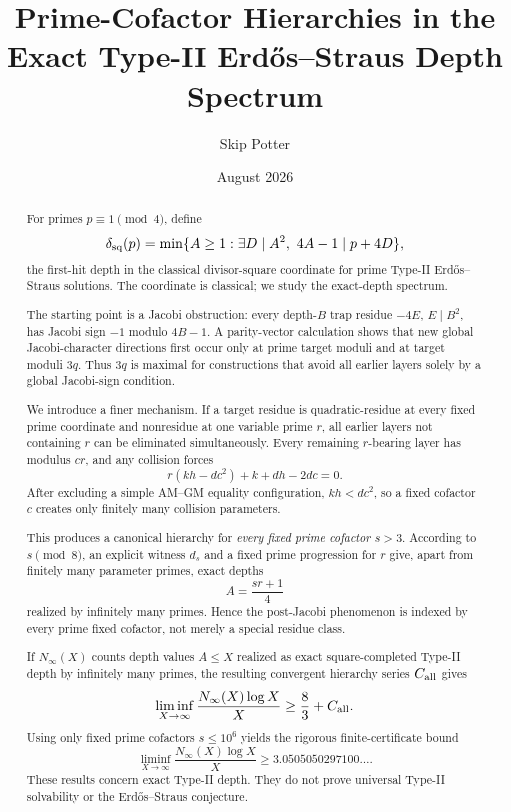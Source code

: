\documentclass[11pt]{article}
\title{Prime-Cofactor Hierarchies in the Exact Type-II Erd\H{o}s--Straus Depth Spectrum}
\author{Skip Potter}
\date{August 2026}
\theoremstyle{definition}
\newcommand{\sqdepth}{\delta_{\rm sq}}
\begin{document}
\maketitle

\begin{abstract}
For primes $p\equiv1\pmod4$, define
\[
\sqdepth(p)=\min\{A\ge1:\exists D\mid A^2,\ 4A-1\mid p+4D\},
\]
the first-hit depth in the classical divisor-square coordinate for prime Type-II Erd\H{o}s--Straus solutions. The coordinate is classical; we study the exact-depth spectrum.

The starting point is a Jacobi obstruction: every depth-$B$ trap residue $-4E$, $E\mid B^2$, has Jacobi sign $-1$ modulo $4B-1$. A parity-vector calculation shows that new global Jacobi-character directions first occur only at prime target moduli and at target moduli $3q$. Thus $3q$ is maximal for constructions that avoid all earlier layers solely by a global Jacobi-sign condition.

We introduce a finer mechanism. If a target residue is quadratic-residue at every fixed prime coordinate and nonresidue at one variable prime $r$, all earlier layers not containing $r$ can be eliminated simultaneously. Every remaining $r$-bearing layer has modulus $cr$, and any collision forces
\[
\boxed{r(kh-dc^2)+k+dh-2dc=0.}
\]
After excluding a simple AM--GM equality configuration, $kh<dc^2$, so a fixed cofactor $c$ creates only finitely many collision parameters.

This produces a canonical hierarchy for \emph{every fixed prime cofactor $s>3$}. According to $s\pmod8$, an explicit witness $d_s$ and a fixed prime progression for $r$ give, apart from finitely many parameter primes, exact depths
\[
A=\frac{sr+1}{4}
\]
realized by infinitely many primes. Hence the post-Jacobi phenomenon is indexed by every prime fixed cofactor, not merely a special residue class.

If $N_\infty(X)$ counts depth values $A\le X$ realized as exact square-completed Type-II depth by infinitely many primes, the resulting convergent hierarchy series $C_{\rm all}$ gives
\[
\liminf_{X\to\infty}\frac{N_\infty(X)\log X}{X}\ge\frac83+C_{\rm all}.
\]
Using only fixed prime cofactors $s\le10^6$ yields the rigorous finite-certificate bound
\[
\boxed{
\liminf_{X\to\infty}\frac{N_\infty(X)\log X}{X}
\ge3.0505050297100\ldots .
}
\]
These results concern exact Type-II depth. They do not prove universal Type-II solvability or the Erd\H{o}s--Straus conjecture.
\end{abstract}
\end{document}
